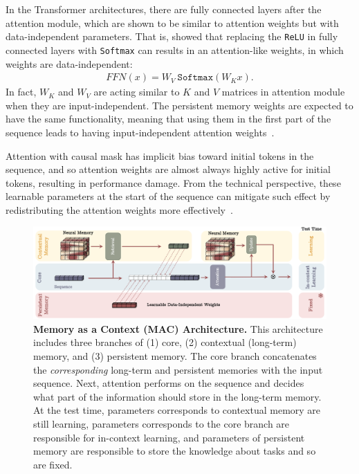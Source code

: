 In the Transformer architectures, there are fully connected layers after the attention module, which are shown to be similar to attention weights but with data-independent parameters. That is, \citet{sukhbaatar2019augmenting} showed that replacing the \texttt{ReLU} in fully connected layers with \texttt{Softmax} can results in an attention-like weights, in which weights are data-independent:
\begin{align}
    FFN(x) = W_V \: \texttt{Softmax}\left( W_K x\right).
\end{align}
In fact, $W_K$ and $W_V$ are acting similar to $K$ and $V$ matrices in attention module when they are input-independent. The persistent memory weights are expected to have the same functionality, meaning that using them in the first part of the sequence leads to having input-independent attention weights~\citep{sukhbaatar2019augmenting}. 


Attention with causal mask has implicit bias toward initial tokens in the sequence, and so attention weights are almost always highly active for initial tokens, resulting in performance damage. From the technical perspective, these learnable parameters at the start of the sequence can mitigate such effect by redistributing the attention weights more effectively~\citep{xiao2024efficient, hanLMInfinite2024}. 



\begin{figure}[t!]
    \centering
    \includegraphics[width=0.9\linewidth]{Figures/loop-arch.png}
    \caption{\textbf{Memory as a Context (MAC) Architecture.} This architecture includes three branches of (1) core, (2) contextual (long-term) memory, and (3) persistent memory. The core branch concatenates the \emph{corresponding} long-term and persistent memories with the input sequence. Next, attention performs on the sequence and decides what part of the information should store in the long-term memory. At the test time, parameters corresponds to contextual memory are still learning, parameters corresponds to the core branch are responsible for in-context learning, and parameters of persistent memory are responsible to store the knowledge about tasks and so are fixed.}
    \label{fig:loop-arch}
\end{figure}












